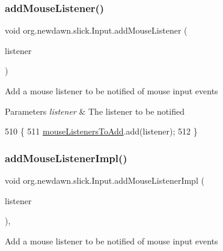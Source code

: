 \subsubsection{\texorpdfstring{add\+Mouse\+Listener()}{addMouseListener()}}
{\footnotesize\ttfamily void org.\+newdawn.\+slick.\+Input.\+add\+Mouse\+Listener (\begin{DoxyParamCaption}\item[{\mbox{\hyperlink{interfaceorg_1_1newdawn_1_1slick_1_1_mouse_listener}{Mouse\+Listener}}}]{listener }\end{DoxyParamCaption})\hspace{0.3cm}{\ttfamily [inline]}}

Add a mouse listener to be notified of mouse input events


\begin{DoxyParams}{Parameters}
{\em listener} & The listener to be notified \\
\hline
\end{DoxyParams}

\begin{DoxyCode}
510                                                          \{
511         \mbox{\hyperlink{classorg_1_1newdawn_1_1slick_1_1_input_af264625d6cf3fdf932e01b8e07949878}{mouseListenersToAdd}}.add(listener);
512     \}
\end{DoxyCode}
\mbox{\label{classorg_1_1newdawn_1_1slick_1_1_input_aaaf3afe7c04bcf66d3e2cff7ed5cd4fc}} 
\subsubsection{\texorpdfstring{add\+Mouse\+Listener\+Impl()}{addMouseListenerImpl()}}
{\footnotesize\ttfamily void org.\+newdawn.\+slick.\+Input.\+add\+Mouse\+Listener\+Impl (\begin{DoxyParamCaption}\item[{\mbox{\hyperlink{interfaceorg_1_1newdawn_1_1slick_1_1_mouse_listener}{Mouse\+Listener}}}]{listener }\end{DoxyParamCaption})\hspace{0.3cm}{\ttfamily [inline]}, {\ttfamily [private]}}

Add a mouse listener to be notified of mouse input events


